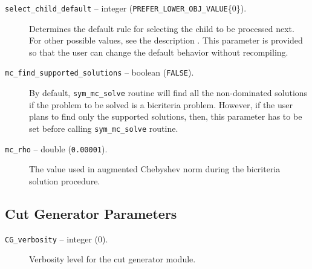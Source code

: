 \begin{description}
\item[{\tt select\_child\_default} -- integer 
({\tt PREFER\_LOWER\_OBJ\_VALUE}\{0\}).]
Determines the default rule for selecting the child to be processed
next. For other possible values, see the description . This
parameter is provided so that the user can change the default behavior
without recompiling.

\item[{\tt mc\_find\_supported\_solutions} -- boolean ({\tt FALSE}).]
By default, {\tt sym\_mc\_solve} routine will find all the non-dominated 
solutions if the problem to be solved is 
a bicriteria problem. However, if the user plans to find only the supported 
solutions, then, this parameter has to be set before 
calling {\tt sym\_mc\_solve} routine. 

\item[{\tt mc\_rho} -- double ({\tt 0.00001}).]
The value used in augmented Chebyshev norm during the bicriteria 
solution procedure.

\end{description}
\subsection{Cut Generator Parameters}

\begin{description}

\item[{\tt CG\_verbosity} -- integer (0).]
Verbosity level for the cut generator module.

\end{description}

